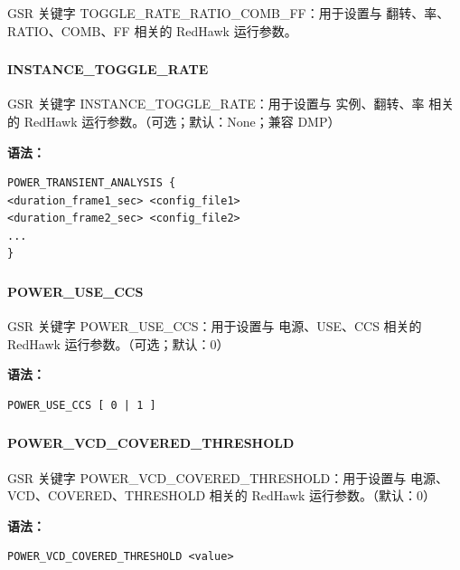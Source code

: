 GSR 关键字 TOGGLE_RATE_RATIO_COMB_FF：用于设置与 翻转、率、RATIO、COMB、FF 相关的 RedHawk 运行参数。

\subsubsection{}
\paragraph*{INSTANCE_TOGGLE_RATE}

GSR 关键字 INSTANCE_TOGGLE_RATE：用于设置与 实例、翻转、率 相关的 RedHawk 运行参数。（可选；默认：None；兼容 DMP）

\textbf{语法：}
\begin{lstlisting}
POWER_TRANSIENT_ANALYSIS {
<duration_frame1_sec> <config_file1>
<duration_frame2_sec> <config_file2>
...
}
\end{lstlisting}

\subsubsection{}
\paragraph*{POWER_USE_CCS}

GSR 关键字 POWER_USE_CCS：用于设置与 电源、USE、CCS 相关的 RedHawk 运行参数。（可选；默认：0）

\textbf{语法：}
\begin{lstlisting}
POWER_USE_CCS [ 0 | 1 ]
\end{lstlisting}

\subsubsection{}
\paragraph*{POWER_VCD_COVERED_THRESHOLD}

GSR 关键字 POWER_VCD_COVERED_THRESHOLD：用于设置与 电源、VCD、COVERED、THRESHOLD 相关的 RedHawk 运行参数。（默认：0）

\textbf{语法：}
\begin{lstlisting}
POWER_VCD_COVERED_THRESHOLD <value>
\end{lstlisting}

\subsubsection{}
